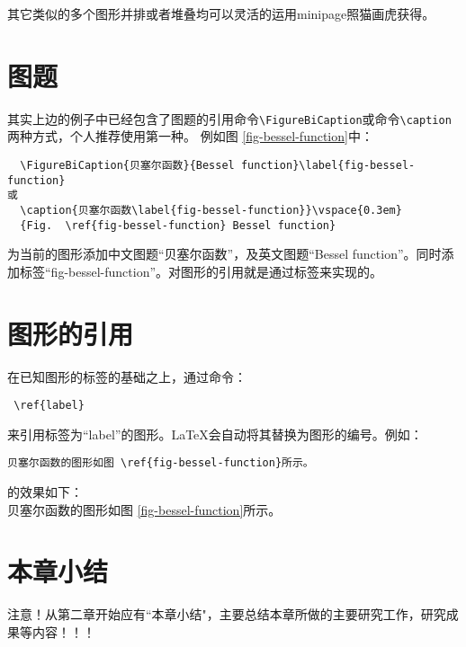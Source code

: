 其它类似的多个图形并排或者堆叠均可以灵活的运用minipage照猫画虎获得。

\section{图题}\label{section2-4}
其实上边的例子中已经包含了图题的引用命令\verb|\FigureBiCaption|或命令\verb|\caption|两种方式，个人推荐使用第一种。
例如图 \ref{fig-bessel-function}中：
\begin{verbatim}
  \FigureBiCaption{贝塞尔函数}{Bessel function}\label{fig-bessel-function}
或
  \caption{贝塞尔函数\label{fig-bessel-function}}\vspace{0.3em}
  {Fig.  \ref{fig-bessel-function} Bessel function}
\end{verbatim}
为当前的图形添加中文图题“贝塞尔函数”，及英文图题“Bessel function”。同时添加标签“fig-bessel-function”。对图形的引用就是通过标签来实现的。

\section{图形的引用}\label{section2-5}
在已知图形的标签的基础之上，通过命令：
\begin{verbatim}
 \ref{label}
\end{verbatim}
来引用标签为“label”的图形。\LaTeX 会自动将其替换为图形的编号。例如：
\begin{verbatim}
贝塞尔函数的图形如图 \ref{fig-bessel-function}所示。
\end{verbatim}
的效果如下：\\
贝塞尔函数的图形如图 \ref{fig-bessel-function}所示。

\section{本章小结}\label{section2-6}
注意！从第二章开始应有``本章小结"，主要总结本章所做的主要研究工作，研究成果等内容！！！

%
